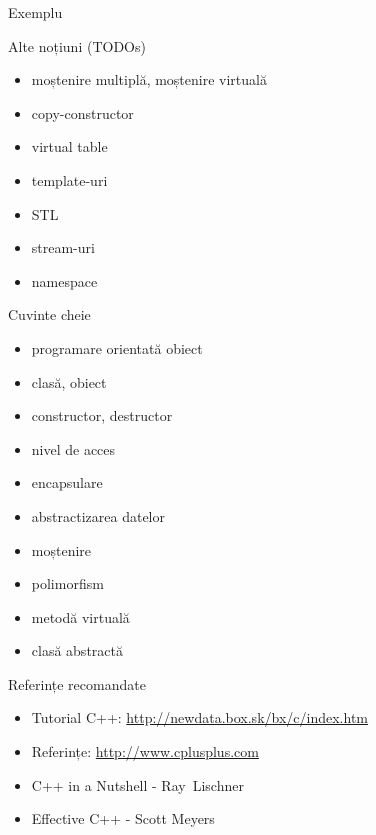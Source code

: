 \documentclass{beamer}
\begin{document}
\begin{frame}{Exemplu}
	\footnotesize{}
\end{frame}

\begin{frame}{Alte noțiuni (TODOs)}
  \begin{itemize}
  \item moștenire multiplă, moștenire virtuală
  \item copy-constructor
  \item virtual table
  \item template-uri
  \item STL 
  \item stream-uri
  \item namespace
  \end{itemize}
\end{frame}

\begin{frame}{Cuvinte cheie}
  \begin{itemize}
   \item programare orientată obiect
   \item clasă, obiect
   \item constructor, destructor
   \item nivel de acces
   \item encapsulare
   \item abstractizarea datelor
   \item moștenire
   \item polimorfism
   \item metodă virtuală
   \item clasă abstractă
  \end{itemize}
\end{frame}

\begin{frame}{Referințe recomandate}
  \begin{itemize}
  \item Tutorial C++: \url{http://newdata.box.sk/bx/c/index.htm}
  \item Referințe: \url{http://www.cplusplus.com}
  \item C++ in a Nutshell - Ray Lischner
  \item Effective C++ - Scott Meyers
  \end{itemize}
\end{frame}
\end{document}
